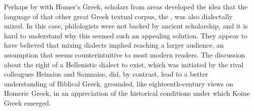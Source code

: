 Perhaps by  with Homer’s Greek, scholars from  areas developed the idea that the language of that other great Greek textual corpus, the , was also dialectally mixed. In this case, philologists were not backed by ancient scholarship, and it is hard to understand why this seemed such an appealing solution. They appear to have believed that mixing dialects implied reaching a larger audience, an assumption that seems counterintuitive to most modern readers. The discussion about the right of a Hellenistic dialect to exist, which was initiated by the rival colleagues Heinsius and Saumaise, did, by contrast, lead to a better understanding of Biblical Greek, grounded, like eighteenth-century views on Homeric Greek, in an appreciation of the historical conditions under which Koine Greek emerged.

